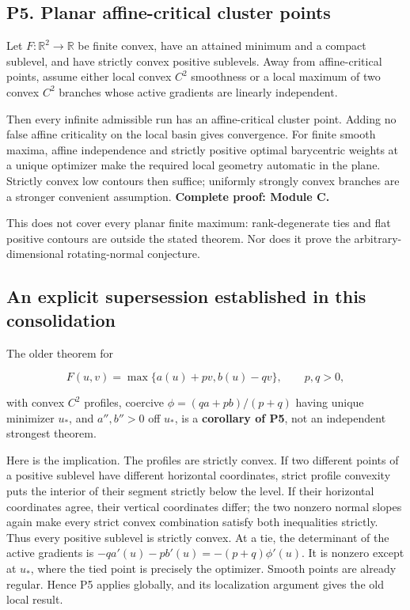 \subsection{P5. Planar affine-critical cluster points}\label{p5.-planar-affine-critical-cluster-points}

Let \(F:\mathbb R^2\to\mathbb R\) be finite convex, have an attained minimum and a compact sublevel, and have strictly convex positive sublevels. Away from affine-critical points, assume either local convex \(C^2\) smoothness or a local maximum of two convex \(C^2\) branches whose active gradients are linearly independent.

Then every infinite admissible run has an affine-critical cluster point. Adding no false affine criticality on the local basin gives convergence. For finite smooth maxima, affine independence and strictly positive optimal barycentric weights at a unique optimizer make the required local geometry automatic in the plane. Strictly convex low contours then suffice; uniformly strongly convex branches are a stronger convenient assumption. \textbf{Complete proof: Module C.}

This does not cover every planar finite maximum: rank-degenerate ties and flat positive contours are outside the stated theorem. Nor does it prove the arbitrary-dimensional rotating-normal conjecture.

\subsection{An explicit supersession established in this consolidation}\label{an-explicit-supersession-established-in-this-consolidation}

The older theorem for

\[F(u,v)=\max\{a(u)+pv,b(u)-qv\},\qquad p,q>0,\]

with convex \(C^2\) profiles, coercive \(\phi=(qa+pb)/(p+q)\) having unique minimizer \(u_*\), and \(a'',b''>0\) off \(u_*\), is a \textbf{corollary of P5}, not an independent strongest theorem.

Here is the implication. The profiles are strictly convex. If two different points of a positive sublevel have different horizontal coordinates, strict profile convexity puts the interior of their segment strictly below the level. If their horizontal coordinates agree, their vertical coordinates differ; the two nonzero normal slopes again make every strict convex combination satisfy both inequalities strictly. Thus every positive sublevel is strictly convex. At a tie, the determinant of the active gradients is \(-qa'(u)-pb'(u)=-(p+q)\phi'(u)\). It is nonzero except at \(u_*\), where the tied point is precisely the optimizer. Smooth points are already regular. Hence P5 applies globally, and its localization argument gives the old local result.

